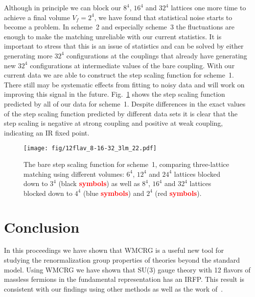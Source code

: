 \documentclass{PoS}
\newcommand{\fig}[1]{Fig.~\ref{#1}}
\newcommand{\TODO}[1]{\textcolor{red}{{\bf #1}}}
\begin{document}
Although in principle we can block our $8^4$, $16^4$ and $32^4$ lattices one more time to achieve a final volume $V_f = 2^4$, we have found that statistical noise starts to become a problem.
In scheme~2 and especially scheme~3 the fluctuations are enough to make the matching unreliable with our current statistics.
It is important to stress that this is an issue of statistics and can be solved by either generating more $32^4$ configurations at the couplings that already have generating new $32^4$ configurations at intermediate values of the bare coupling.
With our current data we are able to construct the step scaling function for scheme~1.
There still may be systematic effects from fitting to noisy data and will work on improving this signal in the future.
\fig{fig:scheme1} shows the step scaling function predicted by all of our data for scheme~1.
Despite differences in the exact values of the step scaling function predicted by different data sets it is clear that the step scaling is negative at strong coupling and positive at weak coupling, indicating an IR fixed point.

\begin{figure}[th]
  \centering
  \texttt{[image: fig/12flav\_8-16-32\_3lm\_22.pdf]}
  \caption{The bare step scaling function for scheme~1, comparing three-lattice matching using different volumes: $6^4$, $12^4$ and $24^4$ lattices blocked down to $3^4$ (black \TODO{symbols}) as well as $8^4$, $16^4$ and $32^4$ lattices blocked down to $4^4$ (blue \TODO{symbols}) and $2^4$ (red \TODO{symbols}).}
  \label{fig:scheme1}
\end{figure}



\section{Conclusion} %
In this proceedings we have shown that WMCRG is a useful new tool for studying the renormalization group properties of theories beyond the standard model.
Using WMCRG we have shown that SU(3) gauge theory with 12 flavors of massless fermions in the fundamental representation has an IRFP.
This result is consistent with our findings using other methods as well as the work of~\TODO{\cite{}}.
\end{document}
